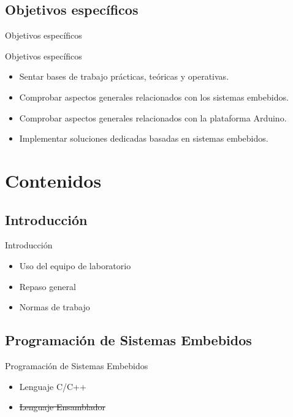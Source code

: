\documentclass[handout,xcolor=dvipsnames]{beamer}
\newcommand{\pageframe}[1]{\frame{\begin{center}{ \Huge #1 }\end{center}}}
\begin{document}
\subsection{Objetivos específicos}

\begin{frame}{Objetivos específicos}
  \begin{block}{Objetivos específicos}
    \begin{itemize}
      \item<1> Sentar bases de trabajo prácticas, teóricas y operativas.
      \item<1> Comprobar aspectos generales relacionados con los sistemas embebidos.
      \item<1> Comprobar aspectos generales relacionados con la plataforma Arduino.
      \item<1> Implementar soluciones dedicadas basadas en sistemas embebidos.
    \end{itemize}
  \end{block}
\end{frame}


\section{Contenidos}

\pageframe{Contenidos}

\subsection[Introducción]{Introducción}

\begin{frame}{Introducción}
  \begin{block}{}
  \begin{itemize}
    \item Uso del equipo de laboratorio
    \item Repaso general
    \item Normas de trabajo
  \end{itemize}
  \end{block}
\end{frame}

\subsection[Embebidos]{Programación de Sistemas Embebidos}

\begin{frame}{Programación de Sistemas Embebidos}
\begin{block}{}
\begin{itemize}
 \item Lenguaje C/C++
 \item \sout{Lenguaje Ensamblador}
\end{itemize}
\end{block}
\end{frame}
\end{document}
